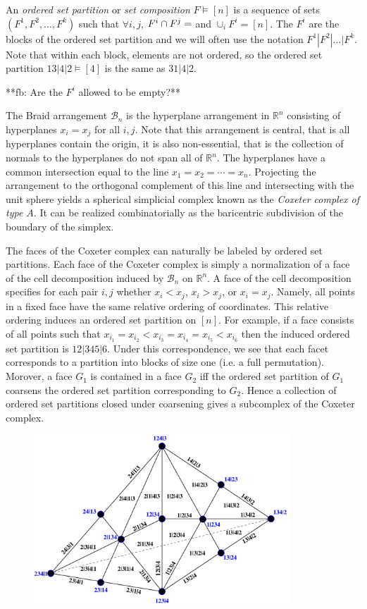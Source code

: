 \documentclass[12pt]{amsart}
\begin{document}
An \emph{ordered set partition} or \emph{set composition} $F \vDash
[n]$ is a sequence of sets $(F^1,F^2, \ldots, F^k)$ such that $\forall
i,j$, $ F^i \cap F^j = \empty$ and $\cup_i F^i = [n]$.  The $F^i$ are the
blocks of the ordered set partition and we will often use the notation
$F^1 | F^2 | \ldots | F^k$.  Note that within each block, elements are
not ordered, so the ordered set partition $13|4|2 \vDash [4]$ is the
same as $31|4|2$.

**fb: Are the $F^i$ allowed to be empty?**


The Braid arrangement $\mathcal{B}_n$ is the hyperplane arrangement in
$\mathbb{R}^n$ consisting of hyperplanes $x_i = x_j$ for all $i,j$.
Note that this arrangement is central, that is all hyperplanes contain
the origin, it is also non-essential, that is the collection of
normals to the hyperplanes do not span all of $\mathbb{R}^n$.  The
hyperplanes have a common intersection equal to the line $x_1 = x_2 = \cdots
= x_n$.  Projecting the arrangement to the orthogonal complement of
this line and intersecting with the unit sphere yields a spherical
simplicial complex known as the \emph{Coxeter complex of type $A$}.
It can be realized combinatorially as the baricentric subdivision of the
boundary of the simplex.


The faces of the Coxeter complex can naturally be labeled by ordered
set partitions.  Each face of the Coxeter complex is simply a
normalization of a face of the cell decomposition induced by
$\mathcal{B}_n$ on $\mathbb{R}^n$.  A face of the cell decomposition specifies for each pair $i,j$ whether $x_i < x_j$, $x_i > x_j$, or $x_i = x_j$.  Namely, all points in a fixed face have
the same relative ordering of coordinates.  This relative ordering
induces an ordered set partition on $[n]$.  For example, if a face
consists of all points such that $x_{i_1} = x_{i_2} < x_{i_3} =
x_{i_4} = x_{i_5} < x_{i_6}$ then the induced ordered set partition is
$12|345|6$.  Under this correspondence, we see that each facet
corresponds to a partition into blocks of size one (i.e. a full
permutation).  Morover, a face $G_1$ is contained in a face $G_2$ iff
the ordered set partition of $G_1$ coarsens the ordered set partition
corresponding to $G_2$.  Hence a collection of ordered set partitions
closed under coarsening gives a subcomplex of the Coxeter complex.

\begin{figure}
\includegraphics[height=2.5in]{Cox.pdf}
\end{figure}
\end{document}
